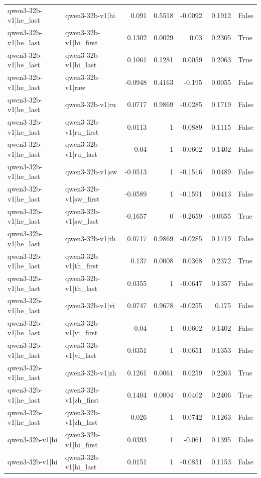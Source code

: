 \begin{table}
\begin{tabular}{l l r r r r l}
qwen3-32b-v1|he_last & qwen3-32b-v1|hi & 0.091 & 0.5518 & -0.0092 & 0.1912 & False \\
qwen3-32b-v1|he_last & qwen3-32b-v1|hi_first & 0.1302 & 0.0029 & 0.03 & 0.2305 & True \\
qwen3-32b-v1|he_last & qwen3-32b-v1|hi_last & 0.1061 & 0.1281 & 0.0059 & 0.2063 & True \\
qwen3-32b-v1|he_last & qwen3-32b-v1|raw & -0.0948 & 0.4163 & -0.195 & 0.0055 & False \\
qwen3-32b-v1|he_last & qwen3-32b-v1|ru & 0.0717 & 0.9869 & -0.0285 & 0.1719 & False \\
qwen3-32b-v1|he_last & qwen3-32b-v1|ru_first & 0.0113 & 1 & -0.0889 & 0.1115 & False \\
qwen3-32b-v1|he_last & qwen3-32b-v1|ru_last & 0.04 & 1 & -0.0602 & 0.1402 & False \\
qwen3-32b-v1|he_last & qwen3-32b-v1|sw & -0.0513 & 1 & -0.1516 & 0.0489 & False \\
qwen3-32b-v1|he_last & qwen3-32b-v1|sw_first & -0.0589 & 1 & -0.1591 & 0.0413 & False \\
qwen3-32b-v1|he_last & qwen3-32b-v1|sw_last & -0.1657 & 0 & -0.2659 & -0.0655 & True \\
qwen3-32b-v1|he_last & qwen3-32b-v1|th & 0.0717 & 0.9869 & -0.0285 & 0.1719 & False \\
qwen3-32b-v1|he_last & qwen3-32b-v1|th_first & 0.137 & 0.0008 & 0.0368 & 0.2372 & True \\
qwen3-32b-v1|he_last & qwen3-32b-v1|th_last & 0.0355 & 1 & -0.0647 & 0.1357 & False \\
qwen3-32b-v1|he_last & qwen3-32b-v1|vi & 0.0747 & 0.9678 & -0.0255 & 0.175 & False \\
qwen3-32b-v1|he_last & qwen3-32b-v1|vi_first & 0.04 & 1 & -0.0602 & 0.1402 & False \\
qwen3-32b-v1|he_last & qwen3-32b-v1|vi_last & 0.0351 & 1 & -0.0651 & 0.1353 & False \\
qwen3-32b-v1|he_last & qwen3-32b-v1|zh & 0.1261 & 0.0061 & 0.0259 & 0.2263 & True \\
qwen3-32b-v1|he_last & qwen3-32b-v1|zh_first & 0.1404 & 0.0004 & 0.0402 & 0.2406 & True \\
qwen3-32b-v1|he_last & qwen3-32b-v1|zh_last & 0.026 & 1 & -0.0742 & 0.1263 & False \\
qwen3-32b-v1|hi & qwen3-32b-v1|hi_first & 0.0393 & 1 & -0.061 & 0.1395 & False \\
qwen3-32b-v1|hi & qwen3-32b-v1|hi_last & 0.0151 & 1 & -0.0851 & 0.1153 & False \\

\end{tabular}
\end{table}
